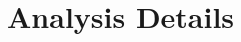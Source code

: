 \documentclass[a4paper,11pt]{article}
\begin{document}
 

\section{Analysis Details}\label{sec:analysis}
\end{document}
